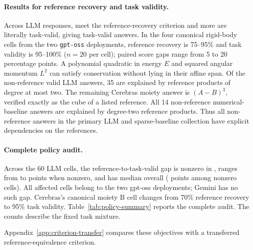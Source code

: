 \documentclass[10pt]{article}
\begin{document}
\paragraph{Results for reference recovery and task validity.} Across \nLLM{} LLM responses, \nExact{} meet the reference-recovery criterion and \nNonReference{} more are literally task-valid, giving \nFirstValid{} task-valid answers. In the four canonical rigid-body cells from the two \texttt{gpt-oss} deployments, reference recovery is 75--95\% and task validity is 95--100\% ($n=20$ per cell); paired score gaps range from 5 to 20 percentage points. A polynomial quadratic in energy $E$ and squared angular momentum $L^2$ can satisfy conservation without lying in their affine span. Of the \nNonReference{} non-reference valid LLM answers, 35 are explained by reference products of degree at most two. The remaining Cerebras moiety answer is $(A-B)^3$, verified exactly as the cube of a listed reference. All 14 non-reference numerical-baseline answers are explained by degree-two reference products. Thus all non-reference answers in the primary LLM and sparse-baseline collection have explicit dependencies on the references.

\paragraph{Complete policy audit.} Across the 60 LLM cells, the reference-to-task-valid gap is nonzero in \nGapCells{}, ranges from \minGap{} to \maxGap{} points when nonzero, and has median \medianGap{} overall (\medianPositiveGap{} points among nonzero cells). All affected cells belong to the two gpt-oss deployments; Gemini has no such gap. Cerebras's canonical moiety B cell changes from 70\% reference recovery to 95\% task validity. Table~\ref{tab:policy-summary} reports the complete audit. The counts describe the fixed task mixture.

\begin{table}[!htbp]
\centering\small
\tabPolicySummary
\caption{LLM policy summary. Additional valid answers are task-valid but outside the affine reference span. Gap cells and maximum gaps compare these two scores across each deployment's 20 cells; gaps are percentage points. All returned responses remain in the denominators.}
\label{tab:policy-summary}
\end{table}

Appendix~\ref{app:criterion-transfer} compares these objectives with a transferred reference-equivalence criterion.
\end{document}

